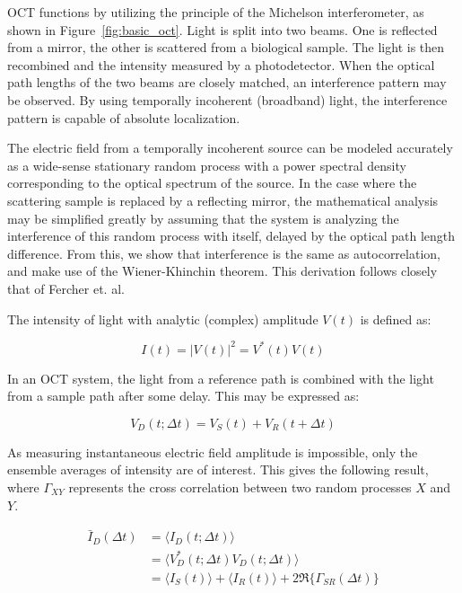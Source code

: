 OCT functions by utilizing the principle of the Michelson interferometer, as shown in Figure~\ref{fig:basic_oct}. Light is split into two beams. One is reflected from a mirror, the other is scattered from a biological sample. The light is then recombined and the intensity measured by a photodetector. When the optical path lengths of the two beams are closely matched, an interference pattern may be observed. By using temporally incoherent (broadband) light, the interference pattern is capable of absolute localization.

The electric field from a temporally incoherent source can be modeled accurately as a wide-sense stationary random process with a power spectral density corresponding to the optical spectrum of the source. \cite{bouma} In the case where the scattering sample is replaced by a reflecting mirror, the mathematical analysis may be simplified greatly by assuming that the system is analyzing the interference of this random process with itself, delayed by the optical path length difference. From this, we show that interference is the same as autocorrelation, and make use of the Wiener-Khinchin theorem. This derivation follows closely that of Fercher et. al. \cite{fercher}

The intensity of light with analytic (complex) amplitude $V(t)$ is defined as:

\begin{equation}
I(t) = |V(t)|^2 = V^*(t)V(t)
\end{equation}

In an OCT system, the light from a reference path is combined with the light from a sample path after some delay. This may be expressed as:

\begin{equation}
V_D(t; \Delta t) = V_S(t) + V_R(t + \Delta t)
\end{equation}

As measuring instantaneous electric field amplitude is impossible, only the ensemble averages of intensity are of interest. This gives the following result, where $\Gamma_{XY}$ represents the cross correlation between two random processes $X$ and $Y$.

\begin{equation}
\begin{aligned}
\bar{I}_D(\Delta t) & =  \langle I_D(t; \Delta t) \rangle \\
& =  \langle V^*_D(t; \Delta t) V_D(t; \Delta t) \rangle \\
& =  \langle I_S(t) \rangle + \langle I_R(t) \rangle + 2 \Re \{\Gamma_{SR} (\Delta t) \}
\end{aligned}
\end{equation}

